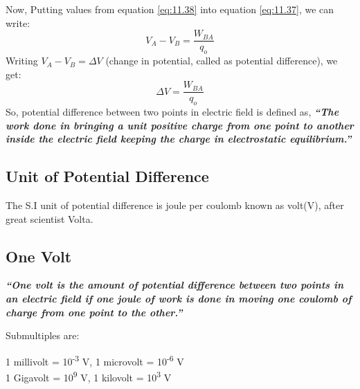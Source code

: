Now, Putting values from equation \ref{eq:11.38} into equation \ref{eq:11.37}, we can
write:
\begin{equation}
  V_{A} - V_{B} = \frac{W_{BA}}{q_{o}} \nonumber
\end{equation}
Writing $V_{A} - V_{B} = \Delta V$ (change in potential, called as potential difference), we get:
\begin{equation}\label{eq:11.42}
  \Delta V = \frac{W_{BA}}{q_{o}}
\end{equation}
So, potential difference between two points in electric field is defined as,
\textit{\textbf{“The work done in bringing a unit positive charge from one point to another
inside the electric field keeping the charge in electrostatic equilibrium.”}}
\subsection*{Unit of Potential Difference}
The S.I unit of potential difference is joule per coulomb known 
as volt(V), after great scientist Volta.
\subsection*{One Volt}
\textit{\textbf{“One volt is the amount of potential difference between
two points in an electric field if one joule of work is done in moving
one coulomb of charge from one point to the other.”}}

\noindent Submultiples are:
\begin{center}
  1 millivolt = 10\textsuperscript{-3} V, 1 microvolt = 10\textsuperscript{-6} V \\
  1 Gigavolt = 10\textsuperscript{9} V, 1 kilovolt = 10\textsuperscript{3} V
\end{center}




















